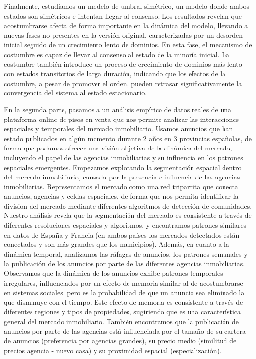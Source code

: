 Finalmente, estudiamos un modelo de umbral simétrico, un modelo donde ambos estados son simétricos e intentan llegar al consenso. Los resultados revelan que acostumbrarse afecta de forma importante en la dinámica del modelo, llevando a nuevas fases no presentes en la versión original, caracterizadas por un desorden inicial seguido de un crecimiento lento de dominios. En esta fase, el mecanismo de costumbre es capaz de llevar al consenso al estado de la minoría inicial. La costumbre también introduce un proceso de crecimiento de dominios más lento con estados transitorios de larga duración, indicando que los efectos de la costumbre, a pesar de promover el orden, pueden retrasar significativamente la convergencia del sistema al estado estacionario.

En la segunda parte, pasamos a un análisis empírico de datos reales de una plataforma online de pisos en venta que nos permite analizar las interacciones espaciales y temporales del mercado inmobiliario. Usamos anuncios que han estado publicados en algún momento durante 2 años en 3 provincias españolas, de forma que podamos ofrecer una visión objetiva de la dinámica del mercado, incluyendo el papel de las agencias inmobiliarias y su influencia en los patrones espaciales emergentes. Empezamos explorando la segmentación espacial dentro del mercado inmobiliario, causada por la presencia e influencia de las agencias inmobiliarias. Representamos el mercado como una red tripartita que conecta anuncios, agencias y celdas espaciales, de forma que nos permita identificar la division del mercado mediante diferentes algoritmos de detección de comunidades. Nuestro análisis revela que la segmentación del mercado es consistente a través de diferentes resoluciones espaciales y algoritmos, y encontramos patrones similares en datos de España y Francia (en ambos países los mercados detectados están conectados y son más grandes que los municipios). Además, en cuanto a la dinámica temporal, analizamos las ráfagas de anuncios, los patrones semanales y la publicación de los anuncios por parte de las diferentes agencias inmobiliarias. Observamos que la dinámica de los anuncios exhibe patrones temporales irregulares, influenciados por un efecto de memoria similar al de acostumbrarse en sistemas sociales, pero es la probabilidad de que un anuncio sea eliminado la que disminuye con el tiempo. Este efecto de memoria es consistente a través de diferentes regiones y tipos de propiedades, sugiriendo que es una característica general del mercado inmobiliario. También encontramos que la publicación de anuncios por parte de las agencias está influenciada por el tamaño de su cartera de anuncios (preferencia por agencias grandes), su precio medio (similitud de precios agencia - nuevo casa) y su proximidad espacial (especialización).

